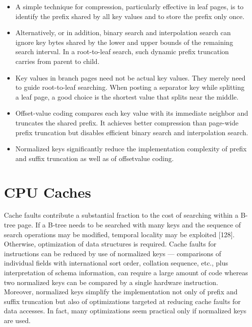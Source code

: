 \begin{itemize}
\item
  A simple technique for compression, particularly effective in leaf
  pages, is to identify the prefix shared by all key values and to store
  the prefix only once.
\item
  Alternatively, or in addition, binary search and interpolation search
  can ignore key bytes shared by the lower and upper bounds of the
  remaining search interval. In a root-to-leaf search, such dynamic
  prefix truncation carries from parent to child.
\item
  Key values in branch pages need not be actual key values. They merely
  need to guide root-to-leaf searching. When posting a separator key
  while splitting a leaf page, a good choice is the shortest value that
  splits near the middle.
\item
  Offset-value coding compares each key value with its immediate
  neighbor and truncates the shared prefix. It achieves better
  compression than page-wide prefix truncation but disables efficient
  binary search and interpolation search.
\item
  Normalized keys significantly reduce the implementation complexity of
  prefix and suffix truncation as well as of offsetvalue coding.
\end{itemize}

\hypertarget{cpu-caches}{%
\section{CPU Caches}\label{cpu-caches}}

Cache faults contribute a substantial fraction to the cost of searching
within a B-tree page. If a B-tree needs to be searched with many keys
and the sequence of search operations may be modified, temporal locality
may be exploited {[}128{]}. Otherwise, optimization of data structures
is required. Cache faults for instructions can be reduced by use of
normalized keys --- comparisons of individual fields with international
sort order, collation sequence, etc., plus interpretation of schema
information, can require a large amount of code whereas two normalized
keys can be compared by a single hardware instruction. Moreover,
normalized keys simplify the implementation not only of prefix and
suffix truncation but also of optimizations targeted at reducing cache
faults for data accesses. In fact, many optimizations seem practical
only if normalized keys are used.

